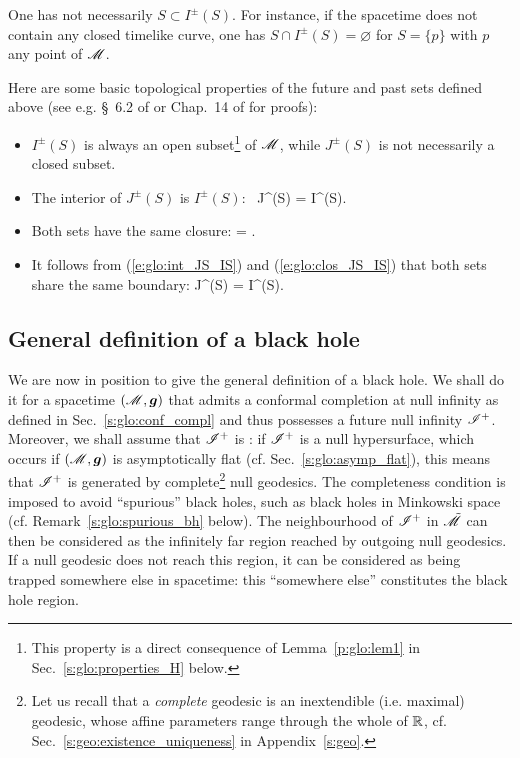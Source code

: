 \begin{remark}
One has not necessarily $S \subset I^\pm(S)$. For instance,
if the spacetime does not contain
any closed timelike curve, one has  $S \cap I^\pm(S) = \varnothing$ for
$S = \{p\}$ with $p$ any point of $\mathscr{M}$.
\end{remark}

Here are some basic topological properties of the future and past sets
defined above (see e.g. \S~6.2 of \cite{HawkiE73} or Chap.~14 of
\cite{ONeil83} for proofs):
\begin{itemize}
\item
$I^\pm(S)$ is always an open subset\footnote{This property is a direct
consequence of Lemma~\ref{p:glo:lem1} in Sec.~\ref{s:glo:properties_H} below.} of $\mathscr{M}$, while
$J^\pm(S)$ is not necessarily a closed subset.
\item The interior of $J^\pm(S)$ is $I^\pm(S)$:
\be \label{e:glo:int_JS_IS}
    \, J^\pm(S) = I^\pm(S).
\ee
\item Both sets have the same closure:
\be \label{e:glo:clos_JS_IS}
     =  .
\ee
\item
It follows from (\ref{e:glo:int_JS_IS}) and (\ref{e:glo:clos_JS_IS})
that both sets share the same boundary:
\be \label{e:glo:boundary_JS_IS}
    \partial J^\pm(S) = \partial I^\pm(S).
\ee
\end{itemize}

\subsection{General definition of a black hole} \label{s:glo:def_BH}

We are now in position to give the general definition of a black hole.
We shall do it for a spacetime $(\mathscr{M},\bm{g})$ that admits a conformal completion
at null infinity as defined in Sec.~\ref{s:glo:conf_compl} and thus
possesses a future null infinity $\mathscr{I}^+$.
Moreover, we shall assume that $\mathscr{I}^+$ is : if $\mathscr{I}^+$
is a null hypersurface, which occurs if $(\mathscr{M},\bm{g})$ is asymptotically flat
(cf. Sec.~\ref{s:glo:asymp_flat}),
this means that $\mathscr{I}^+$ is generated by complete\footnote{Let us recall
that a \emph{complete} geodesic is an inextendible (i.e. maximal) geodesic,
whose affine parameters range through the whole of $\mathbb{R}$, cf. Sec.~\ref{s:geo:existence_uniqueness}
in Appendix~\ref{s:geo}.} null geodesics.
The completeness condition is imposed to avoid ``spurious'' black holes,
such as black holes in Minkowski space (cf. Remark~\ref{s:glo:spurious_bh} below).
The neighbourhood of $\mathscr{I}^+$
in $\tilde{\mathscr{M}}$ can then be considered as the infinitely far region
reached by outgoing null geodesics. If a null geodesic does not reach this
region, it can be considered as being trapped somewhere else in spacetime: this
``somewhere else'' constitutes the black hole region.

